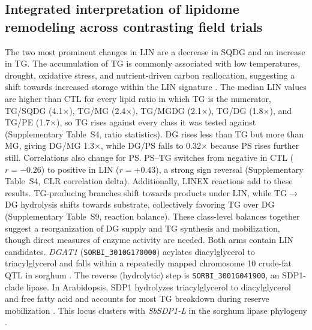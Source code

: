 
\subsection*{Integrated interpretation of lipidome remodeling across contrasting field trials}

The two most prominent changes in LIN are a decrease in SQDG and an increase in TG. The accumulation of TG is commonly associated with low temperatures, drought, oxidative stress, and nutrient-driven carbon reallocation, suggesting a shift towards increased storage within the LIN signature \citep{Tan2018, Yan2025, Pfaff2020}. The median LIN values are higher than CTL for every lipid ratio in which TG is the numerator, TG/SQDG (4.1$\times$), TG/MG (2.4$\times$), TG/MGDG (2.1$\times$), TG/DG (1.8$\times$), and TG/PE (1.7$\times$), so TG rises against every class it was tested against (Supplementary Table~S4, ratio statistics). DG rises less than TG but more than MG, giving DG/MG 1.3$\times$, while DG/PS falls to 0.32$\times$ because PS rises further still. Correlations also change for PS. PS--TG switches from negative in CTL ($r=-0.26$) to positive in LIN ($r=+0.43$), a strong sign reversal (Supplementary Table~S4, CLR correlation delta). Additionally, LINEX reactions add to these results. TG-producing branches shift towards products under LIN, while TG$\rightarrow$DG hydrolysis shifts towards substrate, collectively favoring TG over DG (Supplementary Table~S9, reaction balance). These class-level balances together suggest a reorganization of DG supply and TG synthesis and mobilization, though direct measures of enzyme activity are needed. Both arms contain LIN candidates. \textit{DGAT1} (\texttt{SORBI\_3010G170000}) acylates diacylglycerol to triacylglycerol and falls within a repeatedly mapped chromosome 10 crude-fat QTL in sorghum \citep{Boyles2017DGAT1, Yen2008DGAT}. The reverse (hydrolytic) step is \texttt{SORBI\_3001G041900}, an SDP1-clade lipase. In Arabidopsis, SDP1 hydrolyzes triacylglycerol to diacylglycerol and free fatty acid and accounts for most TG breakdown during reserve mobilization \citep{Kelly2011SDP1L}. This locus clusters with \textit{SbSDP1-L} in the sorghum lipase phylogeny \citep{Sapara2024PLA}.

